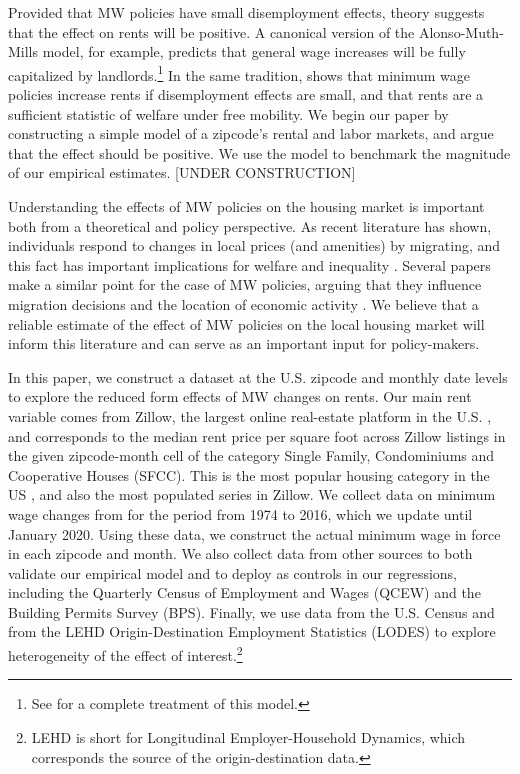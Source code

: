 Provided that MW policies have small disemployment effects, theory suggests that the effect 
on rents will be positive. A canonical version of the Alonso-Muth-Mills model, for example, 
predicts that general wage increases will be fully capitalized by landlords.\footnote{See 
	\textcite{Brueckner1987} for a complete treatment of this model.} 
In the same tradition, \textcite{Yamagishi2020} shows that minimum wage policies increase 
rents if disemployment effects are small, and that rents are a sufficient statistic of welfare 
under free mobility. We begin our paper by constructing a simple model of a zipcode's rental 
and labor markets, and argue that the effect should be positive. We use the model to benchmark 
the magnitude of our empirical estimates. [UNDER CONSTRUCTION] 
 
Understanding the effects of MW policies on the housing market is important both from a 
theoretical and policy perspective. As recent literature has shown, individuals 
respond to changes in local prices (and amenities) by migrating, and this fact has important 
implications for welfare and inequality \parencite{Diamond2016, Couture2019}. Several papers 
make a similar point for the case of MW policies, arguing that they influence migration 
decisions and the location of economic activity \parencite{PerezPerez2018, Monras2019}. We 
believe that a reliable estimate of the effect of MW policies on the local housing market 
will inform this literature and can serve as an important input for policy-makers.
 
In this paper, we construct a dataset at the U.S. zipcode and monthly date levels to explore 
the reduced form effects of MW changes on rents. Our main rent variable comes from Zillow, 
the largest online real-estate platform in the U.S. \parencite{realestateagentpdx, investopedia}, 
and corresponds to the median rent price per square foot across Zillow listings 
in the given zipcode-month cell of the category Single Family, Condominiums and Cooperative 
Houses (SFCC). This is the most popular housing category in the US \parencite{JCHS2020}, 
and also the most populated series in Zillow. We collect data on minimum wage changes from 
\textcite{VaghulZipperer2016} for the period from 1974 to 2016, which we update until January 
2020. Using these data, we construct the actual minimum wage in force in each zipcode and 
month. We also collect data from other sources to both validate our empirical model and to 
deploy as controls in our regressions, including the Quarterly Census of Employment and Wages 
(QCEW) and the Building Permits Survey (BPS). Finally, we use data from the U.S. Census and 
from the LEHD Origin-Destination Employment Statistics (LODES) to explore heterogeneity of 
the effect of interest.\footnote{LEHD is short for Longitudinal Employer-Household Dynamics, 
	which corresponds the source of the origin-destination data.}

